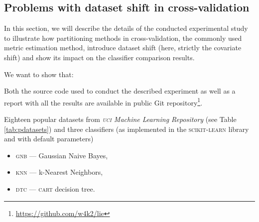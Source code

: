 \documentclass[final,3p,times,onecolumn]{elsarticle}
\begin{document}
\subsection{Problems with dataset shift in cross-validation}

In this section, we will describe the details of the conducted experimental study to illustrate how partitioning methods in cross-validation, the commonly used metric estimation method, introduce dataset shift (here, strictly the covariate shift) and show its impact on the classifier comparison results.


We want to show that:

\begin{quote}
\end{quote}

Both the source code used to conduct the described experiment as well as a report with all the results are available in public Git repository\footnote{\url{https://github.com/w4k2/lie}}. %

Eighteen popular datasets from \emph{\textsc{uci} Machine Learning Repository} (see Table \ref{tab:pdatasets}) \cite{Dua:2019} and three classifiers (as implemented in the \textsc{scikit-learn} library and with default parameters) %

\begin{itemize}
	\item \textsc{gnb} --- Gaussian Naive Bayes,
	\item \textsc{knn} --- k-Nearest Neighbors,
	\item \textsc{dtc} --- \textsc{cart} decision tree.
\end{itemize}
\end{document}
